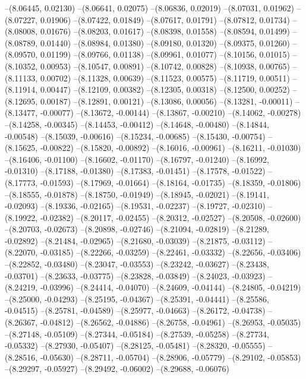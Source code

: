 --(8.06445, 0.02130)
--(8.06641, 0.02075)
--(8.06836, 0.02019)
--(8.07031, 0.01962)
--(8.07227, 0.01906)
--(8.07422, 0.01849)
--(8.07617, 0.01791)
--(8.07812, 0.01734)
--(8.08008, 0.01676)
--(8.08203, 0.01617)
--(8.08398, 0.01558)
--(8.08594, 0.01499)
--(8.08789, 0.01440)
--(8.08984, 0.01380)
--(8.09180, 0.01320)
--(8.09375, 0.01260)
--(8.09570, 0.01199)
--(8.09766, 0.01138)
--(8.09961, 0.01077)
--(8.10156, 0.01015)
--(8.10352, 0.00953)
--(8.10547, 0.00891)
--(8.10742, 0.00828)
--(8.10938, 0.00765)
--(8.11133, 0.00702)
--(8.11328, 0.00639)
--(8.11523, 0.00575)
--(8.11719, 0.00511)
--(8.11914, 0.00447)
--(8.12109, 0.00382)
--(8.12305, 0.00318)
--(8.12500, 0.00252)
--(8.12695, 0.00187)
--(8.12891, 0.00121)
--(8.13086, 0.00056)
--(8.13281, -0.00011)
--(8.13477, -0.00077)
--(8.13672, -0.00144)
--(8.13867, -0.00210)
--(8.14062, -0.00278)
--(8.14258, -0.00345)
--(8.14453, -0.00412)
--(8.14648, -0.00480)
--(8.14844, -0.00548)
--(8.15039, -0.00616)
--(8.15234, -0.00685)
--(8.15430, -0.00754)
--(8.15625, -0.00822)
--(8.15820, -0.00892)
--(8.16016, -0.00961)
--(8.16211, -0.01030)
--(8.16406, -0.01100)
--(8.16602, -0.01170)
--(8.16797, -0.01240)
--(8.16992, -0.01310)
--(8.17188, -0.01380)
--(8.17383, -0.01451)
--(8.17578, -0.01522)
--(8.17773, -0.01593)
--(8.17969, -0.01664)
--(8.18164, -0.01735)
--(8.18359, -0.01806)
--(8.18555, -0.01878)
--(8.18750, -0.01949)
--(8.18945, -0.02021)
--(8.19141, -0.02093)
--(8.19336, -0.02165)
--(8.19531, -0.02237)
--(8.19727, -0.02310)
--(8.19922, -0.02382)
--(8.20117, -0.02455)
--(8.20312, -0.02527)
--(8.20508, -0.02600)
--(8.20703, -0.02673)
--(8.20898, -0.02746)
--(8.21094, -0.02819)
--(8.21289, -0.02892)
--(8.21484, -0.02965)
--(8.21680, -0.03039)
--(8.21875, -0.03112)
--(8.22070, -0.03185)
--(8.22266, -0.03259)
--(8.22461, -0.03332)
--(8.22656, -0.03406)
--(8.22852, -0.03480)
--(8.23047, -0.03553)
--(8.23242, -0.03627)
--(8.23438, -0.03701)
--(8.23633, -0.03775)
--(8.23828, -0.03849)
--(8.24023, -0.03923)
--(8.24219, -0.03996)
--(8.24414, -0.04070)
--(8.24609, -0.04144)
--(8.24805, -0.04219)
--(8.25000, -0.04293)
--(8.25195, -0.04367)
--(8.25391, -0.04441)
--(8.25586, -0.04515)
--(8.25781, -0.04589)
--(8.25977, -0.04663)
--(8.26172, -0.04738)
--(8.26367, -0.04812)
--(8.26562, -0.04886)
--(8.26758, -0.04961)
--(8.26953, -0.05035)
--(8.27148, -0.05109)
--(8.27344, -0.05184)
--(8.27539, -0.05258)
--(8.27734, -0.05332)
--(8.27930, -0.05407)
--(8.28125, -0.05481)
--(8.28320, -0.05555)
--(8.28516, -0.05630)
--(8.28711, -0.05704)
--(8.28906, -0.05779)
--(8.29102, -0.05853)
--(8.29297, -0.05927)
--(8.29492, -0.06002)
--(8.29688, -0.06076)
